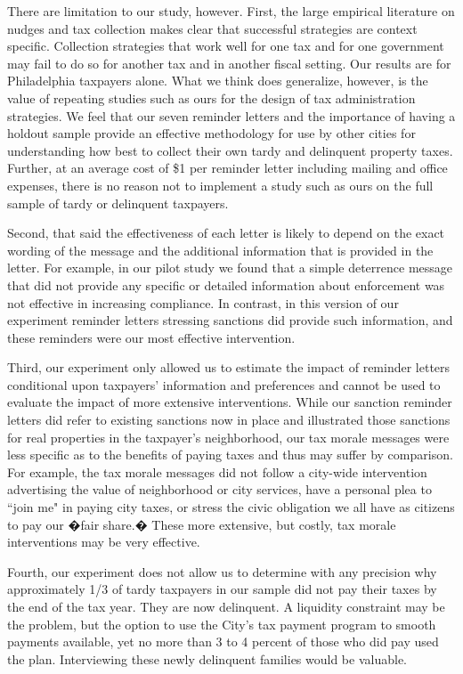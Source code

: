 \documentclass[12pt]{article}
\begin{document}
There are limitation to our study, however. First, the large
empirical literature on nudges and tax collection makes clear that
successful strategies are context specific.  Collection strategies
that work well for one tax and for one government may fail to do so
for another tax and in another fiscal setting.  Our results are for
Philadelphia taxpayers alone.  What we think does generalize, however,
is the value of repeating studies such as ours for the design of tax
administration strategies.  We feel that our seven reminder letters
and the importance of having a holdout sample provide an effective
methodology for use by other cities for understanding how best to
collect their own tardy and delinquent property taxes.  Further, at an
average cost of \$1 per reminder letter including mailing and office
expenses, there is no reason not to implement a study such as ours on
the full sample of tardy or delinquent taxpayers.

Second, that said the effectiveness of each letter is likely to depend
on the exact wording of the message and the additional information
that is provided in the letter.  For example, in our pilot study we
found that a simple deterrence message that did not provide any
specific or detailed information about enforcement was not effective
in increasing compliance.  In contrast, in this version of our
experiment reminder letters stressing sanctions did provide such
information, and these reminders were our most effective intervention.

Third, our experiment only allowed us to estimate the impact of
reminder letters conditional upon taxpayers' information and
preferences and cannot be used to evaluate the impact of more
extensive interventions.  While our sanction reminder letters did
refer to existing sanctions now in place and illustrated those
sanctions for real properties in the taxpayer's neighborhood, our tax
morale messages were less specific as to the benefits of paying taxes
and thus may suffer by comparison.  For example, the tax morale
messages did not follow a city-wide intervention advertising the value
of neighborhood or city services, have a personal plea to ``join me"
in paying city taxes, or stress the civic obligation we all have as
citizens to pay our �fair share.� These more extensive, but costly,
tax morale interventions may be very effective.

Fourth, our experiment does not allow us to determine with any
precision why approximately 1/3 of tardy taxpayers in our sample did
not pay their taxes by the end of the tax year.  They are now
delinquent.  A liquidity constraint may be the problem, but the option
to use the City's tax payment program to smooth payments available,
yet no more than 3 to 4 percent of those who did pay used the plan.
Interviewing these newly delinquent families would be valuable.
\end{document}
